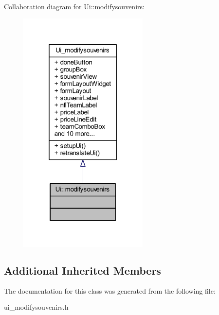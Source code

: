Collaboration diagram for Ui\+:\+:modifysouvenirs\+:\nopagebreak
\begin{figure}[H]
\begin{center}
\leavevmode
\includegraphics[width=184pt]{class_ui_1_1modifysouvenirs__coll__graph}
\end{center}
\end{figure}
\subsection*{Additional Inherited Members}


The documentation for this class was generated from the following file\+:\begin{DoxyCompactItemize}
\item 
ui\+\_\+modifysouvenirs.\+h\end{DoxyCompactItemize}
